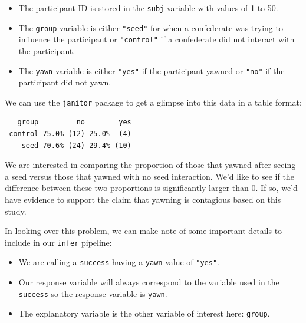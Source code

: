 \documentclass[12pt,]{krantz}
\makeatletter
\newenvironment{Shaded}{\begin{snugshade}}{\end{snugshade}}
\newcommand{\KeywordTok}[1]{\textcolor[rgb]{0.27,0.27,0.27}{\textbf{#1}}}
\newcommand{\StringTok}[1]{\textcolor[rgb]{0.5,0.5,0.5}{#1}}
\newcommand{\CommentTok}[1]{\textcolor[rgb]{0.37,0.37,0.37}{\textit{#1}}}
\newcommand{\OperatorTok}[1]{\textcolor[rgb]{0.43,0.43,0.43}{\textbf{#1}}}
\newcommand{\NormalTok}[1]{#1}
\providecommand{\tightlist}{%
  \setlength{\itemsep}{0pt}\setlength{\parskip}{0pt}}
\newenvironment{kframe}{%
\medskip{}
\setlength{\fboxsep}{.8em}
 \def\at@end@of@kframe{}%
 \ifinner\ifhmode%
  \def\at@end@of@kframe{\end{minipage}}%
  \begin{minipage}{\columnwidth}%
 \fi\fi%
 \def\FrameCommand##1{\hskip\@totalleftmargin \hskip-\fboxsep
 \colorbox{shadecolor}{##1}\hskip-\fboxsep
     \hskip-\linewidth \hskip-\@totalleftmargin \hskip\columnwidth}%
 \MakeFramed {\advance\hsize-\width
   \@totalleftmargin\z@ \linewidth\hsize
   \@setminipage}}%
 {\par\unskip\endMakeFramed%
 \at@end@of@kframe}
\renewenvironment{Shaded}{\begin{kframe}}{\end{kframe}}
\makeatother
\begin{document}
\begin{itemize}
\tightlist
\item
  The participant ID is stored in the \texttt{subj} variable with values
  of 1 to 50.
\item
  The \texttt{group} variable is either \texttt{"seed"} for when a
  confederate was trying to influence the participant or
  \texttt{"control"} if a confederate did not interact with the
  participant.
\item
  The \texttt{yawn} variable is either \texttt{"yes"} if the participant
  yawned or \texttt{"no"} if the participant did not yawn.
\end{itemize}

We can use the \texttt{janitor} package to get a glimpse into this data
in a table format:

\begin{Shaded}
\end{Shaded}

\begin{verbatim}
   group         no        yes
 control 75.0% (12) 25.0%  (4)
    seed 70.6% (24) 29.4% (10)
\end{verbatim}

We are interested in comparing the proportion of those that yawned after
seeing a seed versus those that yawned with no seed interaction. We'd
like to see if the difference between these two proportions is
significantly larger than 0. If so, we'd have evidence to support the
claim that yawning is contagious based on this study.

In looking over this problem, we can make note of some important details
to include in our \texttt{infer} pipeline:

\begin{itemize}
\tightlist
\item
  We are calling a \texttt{success} having a \texttt{yawn} value of
  \texttt{"yes"}.
\item
  Our response variable will always correspond to the variable used in
  the \texttt{success} so the response variable is \texttt{yawn}.
\item
  The explanatory variable is the other variable of interest here:
  \texttt{group}.
\end{itemize}
\end{document}
